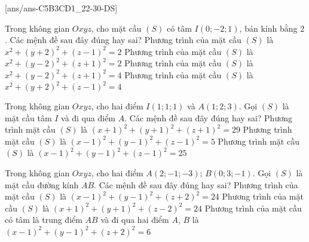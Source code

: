 \TNTF
{}[ans/ans-C5B3CD1_22-30-DS]
\begin{ex}%
Trong không gian $Oxyz$, cho mặt cầu $(S)$ có tâm $I(0;-2;1)$, bán kính bằng $ 2 $. Các mệnh đề sau đây đúng hay sai?
\choiceTF
{Phương trình của mặt cầu $(S)$ là $x^2+(y+2)^2+(z-1)^2=2$}
{Phương trình của mặt cầu $(S)$ là $x^2+(y-2)^2+(z+1)^2=2$}
{Phương trình của mặt cầu $(S)$ là $x^2+(y-2)^2+(z+1)^2=4$}
{\True Phương trình của mặt cầu $(S)$ là $x^2+(y+2)^2+(z-1)^2=4$}
\end{ex}
\begin{ex}%
Trong không gian $Oxyz$, cho hai điểm $I(1;1;1)$ và $A(1;2;3)$. Gọi $(S)$ là mặt cầu tâm $ I $ và đi qua điểm $ A $. Các mệnh đề sau đây đúng hay sai?
{Phương trình mặt cầu $ (S)$ là $(x+1)^{2}+(y+1)^{2}+(z+1)^{2}=29$}
{\True Phương trình mặt cầu $ (S)$ là $(x-1)^{2}+(y-1)^{2}+(z-1)^{2}=5$}
{Phương trình mặt cầu $ (S) $ là $(x-1)^2+(y-1)^2+(z-1)^2=25$}
\end{ex}
\begin{ex}%
Trong không gian $Oxyz$, cho hai điểm $A(2;-1;-3)$; $B(0;3;-1)$. Gọi $ (S) $ là mặt cầu đường kính $ AB $. Các mệnh đề sau đây đúng hay sai?
{Phương trình của mặt cầu $ (S) $ là $(x-1)^2+(y-1)^2+(z+2)^2=24$}
{Phương trình của mặt cầu $ (S) $ là $(x+1)^2+(y+1)^2+(z-2)^2=24$}
{\True Phương trình của mặt cầu có tâm là trung điểm $AB$ và đi qua hai điểm $A$, $B$ là $(x-1)^2+(y-1)^2+(z+2)^2=6$}
\end{ex}
